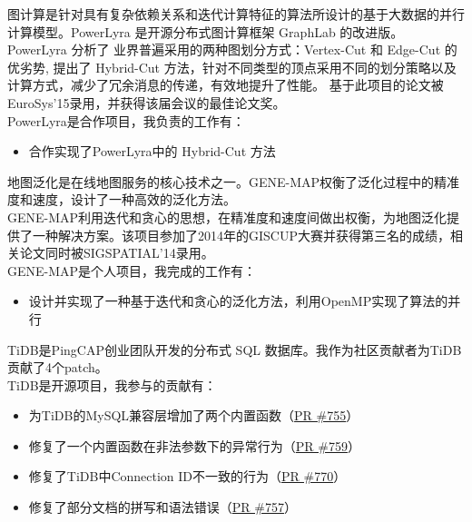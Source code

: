 \documentclass{resume}
\begin{document}
图计算是针对具有复杂依赖关系和迭代计算特征的算法所设计的基于大数据的并行计算模型。PowerLyra 是开源分布式图计算框架 GraphLab 的改进版。
\\[5pt]
PowerLyra 分析了 业界普遍采用的两种图划分方式：Vertex-Cut 和 Edge-Cut 的优劣势, 提出了 Hybrid-Cut 方法，针对不同类型的顶点采用不同的划分策略以及计算方式，减少了冗余消息的传递，有效地提升了性能。
基于此项目的论文被EuroSys’15录用，并获得该届会议的最佳论文奖。
\\[5pt]
PowerLyra是合作项目，我负责的工作有：
\begin{itemize}[parsep=0.5ex]
  \item 合作实现了PowerLyra中的 Hybrid-Cut 方法
\end{itemize}

地图泛化是在线地图服务的核心技术之一。GENE-MAP权衡了泛化过程中的精准度和速度，设计了一种高效的泛化方法。
\\[5pt]
GENE-MAP利用迭代和贪心的思想，在精准度和速度间做出权衡，为地图泛化提供了一种解决方案。该项目参加了2014年的GISCUP大赛并获得第三名的成绩，相关论文同时被SIGSPATIAL’14录用。
\\[5pt]
GENE-MAP是个人项目，我完成的工作有：
\begin{itemize}[parsep=0.5ex]
  \item 设计并实现了一种基于迭代和贪心的泛化方法，利用OpenMP实现了算法的并行
\end{itemize}

TiDB是PingCAP创业团队开发的分布式 SQL 数据库。我作为社区贡献者为TiDB贡献了4个patch。
\\[5pt]
TiDB是开源项目，我参与的贡献有：
\begin{itemize}[parsep=0.5ex]
  \item 为TiDB的MySQL兼容层增加了两个内置函数（\href{https://github.com/pingcap/tidb/pull/755}{PR \#755}）
  \item 修复了一个内置函数在非法参数下的异常行为（\href{https://github.com/pingcap/tidb/pull/759}{PR \#759}）
  \item 修复了TiDB中Connection ID不一致的行为（\href{https://github.com/pingcap/tidb/pull/770}{PR \#770}）
  \item 修复了部分文档的拼写和语法错误（\href{https://github.com/pingcap/tidb/pull/757}{PR \#757}）
\end{itemize}
\end{document}
